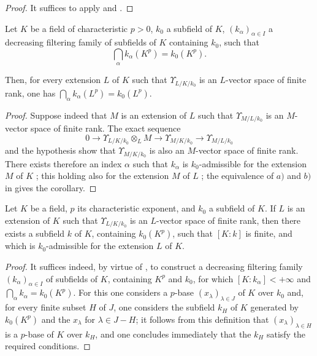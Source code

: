 \begin{proof}
It suffices to apply  and .
\end{proof}

\begin{corollary}[21.8.5]
\label{0.21.8.5}
Let $K$ be a field of characteristic $p>0$, $k_0$ a subfield of $K$, $(k_\alpha)_{\alpha\in I}$ a decreasing filtering family of subfields of $K$ containing $k_0$, such that
\[
  \bigcap_\alpha k_\alpha(K^p)=k_0(K^p).
\]

Then, for every extension $L$ of $K$ such that $\Upsilon_{L/K/k_0}$ is an $L$-vector space of finite rank, one has $\bigcap_\alpha k_\alpha(L^p)=k_0(L^p)$.
\end{corollary}

\begin{proof}
Suppose indeed that $M$ is an extension of $L$ such that $\Upsilon_{M/L/k_0}$ is an $M$-vector space of finite rank.
The exact sequence 
\[
  0\to\Upsilon_{L/K/k_0}\otimes_L M\to\Upsilon_{M/K/k_0}\to\Upsilon_{M/L/k_0}
\]
and the hypothesis show that $\Upsilon_{M/K/k_0}$ is also an $M$-vector space of finite rank.
There exists therefore an index $\alpha$ such that $k_\alpha$ is $k_0$-admissible for the extension $M$ of $K$ ; this holding also for the extension $M$ of $L$ ; the equivalence of $a)$ and $b)$ in  gives the corollary.
\end{proof}

\begin{corollary}[21.8.6]
\label{0.21.8.6}
Let $K$ be a field, $p$ its characteristic exponent, and $k_0$ a subfield of $K$.
If $L$ is an extension of $K$ such that $\Upsilon_{L/K/k_0}$ is an $L$-vector space of finite rank, then there exists a subfield $k$ of $K$, containing $k_0(K^p)$, such that $[K:k]$ is finite, and which is $k_0$-admissible for the extension $L$ of $K$.
\end{corollary}

\begin{proof}
It suffices indeed, by virtue of , to construct a decreasing filtering family $(k_\alpha)_{\alpha\in I}$ of subfields of $K$, containing $K^p$ and $k_0$, for which $[K:k_\alpha]<+\infty$ and $\bigcap_\alpha k_\alpha=k_0(K^p)$.
For this one considers a $p$-base $(x_\lambda)_{\lambda\in J}$ of $K$ over $k_0$ and, for every finite subset $H$ of $J$, one considers the subfield $k_H$ of $K$ generated by $k_0(K^p)$ and the $x_\lambda$ for $\lambda\in J-H$; it follows from this definition that $(x_\lambda)_{\lambda\in H}$ is a $p$-base of $K$ over $k_H$, and one concludes immediately that the $k_H$ satisfy the required conditions.
\end{proof}

